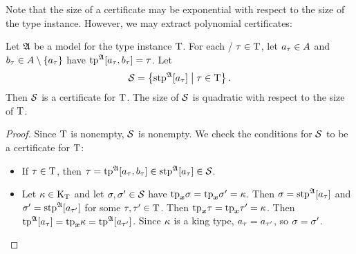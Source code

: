 Note that the size of a certificate may be exponential with respect to the size
of the type instance.
However, we may extract polynomial certificates:
\begin{lemma}\label{lem:cert-extract}
Let $\mathfrak{A}$ be a model for the type instance $\mathrm{T}$.
For each \twotype/ $\tau\in\mathrm{T}$,
let $a_{\tau}\in A$ and $b_{\tau}\in A\setminus\left\{a_{\tau}\right\}$
have $\operatorname{tp}^{\mathfrak{A}}[a_{\tau},b_{\tau}] = \tau$.
Let 
\[
  \mathcal{S} = \left\{\operatorname{stp}^{\mathfrak{A}}[a_{\tau}]\mathrel{}\middle|\mathrel{}\tau \in \mathrm{T}\right\}.
\]
Then $\mathcal{S}$ is a certificate for $\mathrm{T}$.
The size of $\mathcal{S}$ is quadratic with respect to the size of $\mathrm{T}$.
\end{lemma}
\begin{proof}
Since $\mathrm{T}$ is nonempty, $\mathcal{S}$ is nonempty.
We check the conditions for $\mathcal{S}$ to be a certificate for $\mathrm{T}$:
\begin{itemize}
  \item[\refcondcertT]
  If $\tau\in\mathrm{T}$,
  then $\tau=\operatorname{tp}^{\mathfrak{A}}[a_{\tau},b_{\tau}] \in \operatorname{stp}^{\mathfrak{A}}[a_{\tau}] \in
  \mathcal{S}$.
  \item[\refcondcertk]
  Let $\kappa\in{\mathrm{K}}_{\mathrm{T}}$ and let $\sigma,{\sigma'} \in \mathcal{S}$ have
  $\mathrm{tp}_{\bm{x}}\sigma = \mathrm{tp}_{\bm{x}}{\sigma'} = \kappa$.
  Then $\sigma = \operatorname{stp}^{\mathfrak{A}}[a_{\tau}]$ and ${\sigma'} = \operatorname{stp}^{\mathfrak{A}}[a_{{\tau'}}]$ for
  some $\tau,{\tau'}\in\mathrm{T}$.
  Then $\mathrm{tp}_{\bm{x}}\tau = \mathrm{tp}_{\bm{x}}{\tau'} = \kappa$.
  Then $\operatorname{tp}^{\mathfrak{A}}[a_{\tau}] = \mathrm{tp}_{\bm{x}}\kappa = \operatorname{tp}^{\mathfrak{A}}[a_{{\tau'}}]$.
  Since $\kappa$ is a king type, $a_{\tau} = a_{{\tau'}}$, so
  $\sigma = {\sigma'}$.
\end{itemize}
\end{proof}

